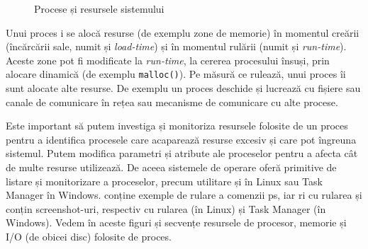 \begin{figure}[!htbp]
	\centering
	\def\svgwidth{0.8\textwidth}
	
	\caption{Procese și resursele sistemului}
	\label{fig:process-resources}
\end{figure}

Unui proces i se alocă resurse (de exemplu zone de memorie) în momentul creării
(încărcării sale, numit și \textit{load-time}) și în momentul rulării (numit și
\textit{run-time}). Aceste zone pot fi modificate la \textit{run-time}, la cererea procesului
însuși, prin alocare dinamică (de exemplu \texttt{malloc()}). Pe măsură ce rulează, unui
proces îi sunt alocate alte resurse. De exemplu un proces deschide și lucrează
cu fișiere sau canale de comunicare în rețea sau mecanisme de comunicare cu alte
procese.

Este important să putem investiga și monitoriza resursele folosite de un proces
pentru a identifica procesele care acaparează resurse excesiv și care pot
îngreuna sistemul. Putem modifica parametri și atribute ale proceselor pentru a
afecta cât de multe resurse utilizează. De aceea sistemele de operare oferă
primitive de listare și monitorizare a proceselor, precum utilitare  și  în
Linux sau Task Manager în Windows.  conține exemple de rulare a comenzii ps, iar 
ri cu rularea   și  conțin screenshot-uri, respectiv cu rularea  (în Linux) și Task Manager (în Windows). Vedem în aceste figuri și secvențe resursele de procesor, memorie și
I/O (de obicei disc) folosite de proces.


